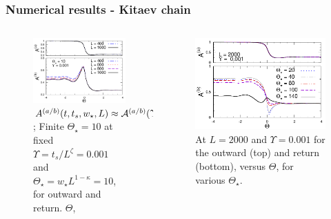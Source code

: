 \begin{frame}
	
	\frametitle{Numerical results - Kitaev chain}
	
	\begin{columns}
	\begin{column}{0.52\textwidth}
		\begin{figure}[!htb]
			\includegraphics[width=1\columnwidth]{paper/headKITY0001Th10A.pdf}
  			\caption{ \alert{$ A^{(a/b)}(t,t_s,w_\star,L) \approx 
 				{\cal A}^{(a/b)}(\Upsilon,\Theta,\Theta_\star)\,\,$};
  			Finite $\Theta_\star=10$ at fixed $\Upsilon =t_s/L^\zeta = 0.001$
  			and $\Theta_\star = w_\star L^{1-\kappa}=10$, for outward
  			 and return.
    $\Theta$, }
  			\label{roundtripdfssE}
		\end{figure}
	
	\end{column}
	\begin{column}{0.5\textwidth}
	
	\begin{figure}[!htb]
  		\includegraphics[width=1\columnwidth]{paper/headKITY0001L2000A.pdf}
 		\caption{At $L=2000$ and $\Upsilon = 0.001$ for the outward (top)
 		 and return (bottom), versus $\Theta$, for various 
 		 $\Theta_\star$. $\qquad \qquad \qquad \qquad \qquad \qquad \qquad \qquad \qquad \qquad \qquad \qquad \qquad \qquad \qquad \qquad$}
  \label{diffThetaStarA}
\end{figure}


\end{column}
\end{columns}
\end{frame}
